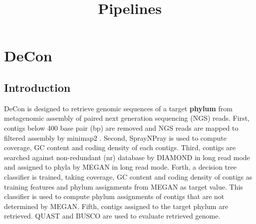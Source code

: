 \documentclass[11pt]{article}
\title{Pipelines}
\author{}
\date{}
\begin{document}
\begin{sloppypar}
  \maketitle

  \linenumbers
\section{DeCon}
\subsection{Introduction}
DeCon is designed to retrieve genomic sequences of a target \textbf{phylum} from metagenomic assembly of paired next generation sequencing (NGS) reads. 
First, contigs below 400 base pair (bp) are removed and NGS reads are mapped to filtered assembly by minimap2 \parencite{li2018minimap2}. 
Second, SprayNPray \parencite{garber2022spraynpray} is used to compute coverage, GC content and coding density of each contigs. 
Third, contigs are searched against non-redundant (nr) database by DIAMOND \parencite{buchfink2015fast} in long read mode and assigned to phyla by MEGAN \parencite{huson2007megan} in long read mode. 
Forth, a decision tree classifier is trained, taking coverage, GC content and coding density of contigs as training features and phylum assignments from MEGAN as target value. 
This classifier is used to compute phylum assignments of contigs that are not determined by MEGAN. 
Fifth, contigs assigned to the target phylum are retrieved. 
QUAST \parencite{gurevich2013quast} and BUSCO \parencite{simao2015busco} are used to evaluate retrieved genome. 

\end{sloppypar}
\end{document}
